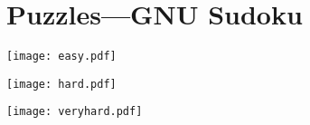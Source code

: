 \raggedbottom


%

\pagestyle{fancy}

\setlength{\parindent}{0em}
\setlength{\parskip}{1.2em}















\clearpage
\pagestyle{empty}

\setlength{\voffset}{0cm}


\addtocounter{chapter}{1}




\clearpage

\setlength{\voffset}{-1in}

\pagestyle{fancy}

\chapter{Puzzles---GNU Sudoku}

\centering

\pagestyle{empty}

\vspace{\fill}
\texttt{[image: easy.pdf]}
\vspace{\fill}

\vspace{\fill}
\texttt{[image: hard.pdf]}
\vspace{\fill}

\vspace{\fill}
\texttt{[image: veryhard.pdf]}
\vspace{\fill}

